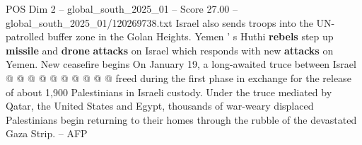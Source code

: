 \begin{textsample}{POS Dim 2 – global\_south\_2025\_01 – Score 27.00 – global\_south\_2025\_01/120269738.txt}
Israel also sends troops into the UN-patrolled buffer zone in the Golan Heights.
Yemen ' s Huthi \textbf{rebels} step up \textbf{missile} and \textbf{drone} \textbf{attacks} on Israel which responds with new \textbf{attacks} on Yemen.
New ceasefire begins On January 19, a long-awaited truce between Israel @ @ @ @ @ @ @ @ @ @ freed during the first phase in exchange for the release of about 1,900 Palestinians in Israeli custody.
Under the truce mediated by Qatar, the United States and Egypt, thousands of war-weary displaced Palestinians begin returning to their homes through the rubble of the devastated Gaza Strip. -- AFP

\end{textsample}
